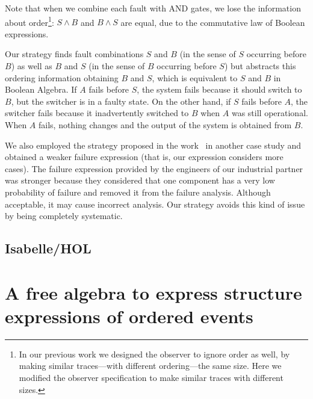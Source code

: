 \documentclass[12pt,openright,twoside,a4paper,oldfontcommands,english,brazil,final]{abntex2}
\theoremstyle{theo}
\begin{document}
Note that when we combine each fault with \ac{AND} gates, we lose the information about order\footnote{In our previous work we designed the observer to ignore order as well, by making similar traces---with different ordering---the same size. Here we modified the observer specification to make similar traces with different sizes.}: $S \land B$ and $B \land S$ are equal, due to the commutative law of Boolean expressions.

Our strategy finds fault combinations $S$ and $B$ (in the sense of $S$ occurring before $B$) as well as $B$ and $S$ (in the sense of $B$ occurring before $S$) but abstracts this ordering information obtaining $B$ and $S$, which is equivalent to $S$ and $B$ in Boolean Algebra.
%
If $A$ fails before $S$, the system fails because it should switch to $B$, but the switcher is in a faulty state.
%
On the other hand, if $S$ fails before $A$, the switcher fails because it inadvertently switched to $B$ when $A$ was still operational.
%
When $A$ fails, nothing changes and the output of the system is obtained from $B$.

We also employed the strategy proposed in the work~\cite{DM2012} in another case study and obtained a weaker failure expression (that is, our expression considers more cases).
The failure expression provided by the engineers of our industrial partner was stronger because they considered that one component has a very low probability of failure and removed it from the failure analysis.
Although acceptable, it may cause incorrect analysis.
Our strategy avoids this kind of issue by being completely systematic.

\section{Isabelle/HOL}
\label{sec:isabelle}




\chapter{A free algebra to express structure expressions of ordered events}
\label{chap:algebra}
\end{document}
